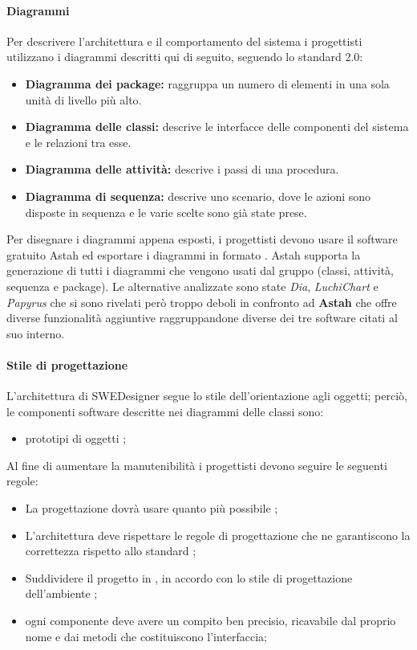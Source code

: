\paragraph{Diagrammi} Per descrivere l’architettura e il comportamento del
sistema i progettisti utilizzano i diagrammi  descritti qui di seguito, seguendo
lo standard  2.0:
\begin{itemize}
\item\textbf{ Diagramma dei package: }raggruppa un numero di elementi  in
una sola unità di livello più alto.
\item \textbf{Diagramma delle classi: }descrive le interfacce delle componenti del
sistema e le relazioni tra esse.
\item \textbf{Diagramma delle attività: }descrive i passi di una procedura.
\item \textbf{Diagramma di sequenza: }descrive uno scenario, dove le azioni sono disposte
in sequenza e le varie scelte sono già state prese.
\end{itemize}
Per disegnare i diagrammi appena esposti, i progettisti devono usare il software
gratuito Astah ed esportare i diagrammi in formato . Astah supporta la
generazione di tutti i diagrammi che vengono usati dal gruppo (classi, attività,
sequenza e package). Le alternative analizzate sono state \emph{Dia}, \emph{LuchiChart} e \emph{Papyrus} che si sono rivelati però troppo deboli in confronto ad \textbf{Astah} che offre
      diverse funzionalità aggiuntive raggruppandone diverse dei tre software citati al suo interno.

\paragraph{Stile di progettazione} L’architettura di SWEDesigner segue lo
stile dell’orientazione agli oggetti; perciò, le componenti software descritte
nei diagrammi delle classi sono:
\begin{itemize}
\item prototipi di oggetti ;
\end{itemize}

Al fine di aumentare la manutenibilità i progettisti devono seguire le seguenti regole:
\begin{itemize}
\item La progettazione dovrà usare quanto più possibile ;
\item L'architettura deve rispettare le regole di progettazione che ne garantiscono la correttezza rispetto allo standard ;
\item Suddividere il progetto in , in accordo con lo stile di progettazione dell'ambiente ;
\item ogni componente deve avere un compito ben precisio, ricavabile dal proprio nome e dai metodi che costituiscono l'interfaccia;
\end{itemize}

